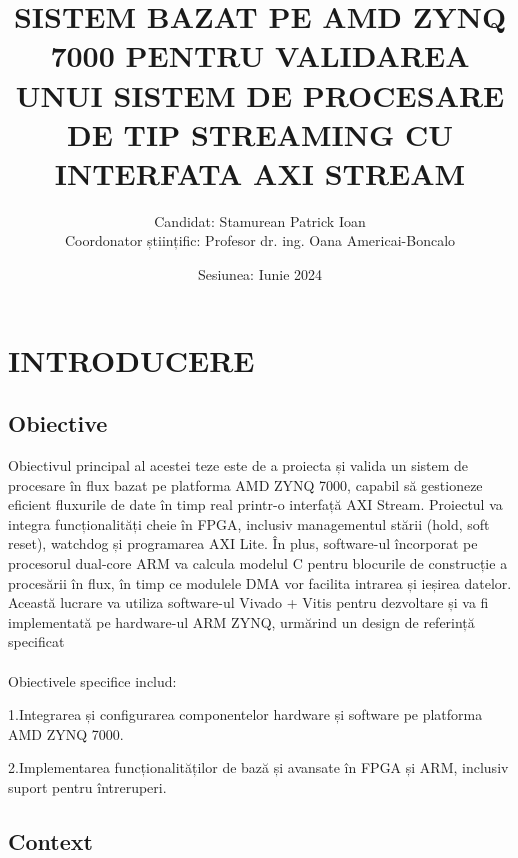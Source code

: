 \documentclass[12pt]{article}
\title{\uppercase{\bfseries{Sistem bazat pe AMD ZYNQ 7000 pentru validarea unui sistem de procesare de tip streaming cu interfata AXI stream}}}
\author{Candidat: Stamurean Patrick Ioan\\Coordonator științific: Profesor dr. ing. Oana Americai-Boncalo}
\date{Sesiunea: Iunie 2024}
\begin{document}
\maketitle



\newpage
\renewcommand{\contentsname}{Cuprins}
\tableofcontents



\newpage
\section{\uppercase{Introducere}}
\subsection{Obiective}

\hspace*{1cm}Obiectivul principal al acestei teze este de a proiecta și valida un sistem de procesare în flux bazat pe platforma AMD ZYNQ 7000, capabil să gestioneze eficient fluxurile de date în timp real printr-o interfață AXI Stream. Proiectul va integra funcționalități cheie în FPGA, inclusiv managementul stării (hold, soft reset), watchdog și programarea AXI Lite. În plus, software-ul încorporat pe procesorul dual-core ARM va calcula modelul C pentru blocurile de construcție a procesării în flux, în timp ce modulele DMA vor facilita intrarea și ieșirea datelor. Această lucrare va utiliza software-ul Vivado + Vitis pentru dezvoltare și va fi implementată pe hardware-ul ARM ZYNQ, urmărind un design de referință specificat\\\\
\hspace*{1cm}Obiectivele specifice includ:

\hspace*{1cm}1.Integrarea și configurarea componentelor hardware și software pe platforma AMD ZYNQ 7000.

\hspace*{1cm}2.Implementarea funcționalităților de bază și avansate în FPGA și ARM, inclusiv suport pentru întreruperi.

\subsection{Context}
\end{document}
